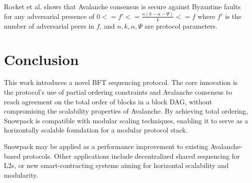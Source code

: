 \documentclass[12pt]{article}
\begin{document}
  Rocket et al. shows that Avalanche consensus is secure against Byzantine
  faults for any adversarial presence of $ 0 <= f' <=
  \frac{n(k-\alpha-\Psi)}{k} <= f $ where $f'$ is the number of adversarial
  peers in $f$, and $n, k, \alpha, \Psi$ are protocol parameters.

\section{Conclusion}
  This work introduces a novel BFT sequencing protocol. The core innovation is
  the protocol's use of partial ordering constraints and Avalanche consensus to
  reach agreement on the total order of blocks in a block DAG, without
  compromising the scalability properties of Avalanche. By achieving total
  ordering, Snowpack is compatible with modular scaling techniques, enabling it
  to serve as a horizontally scalable foundation for a modular protocol stack.

  Snowpack may be applied as a performance improvement to existing
  Avalanche-based protocols. Other applications include decentralized shared
  sequencing for L2s, or new smart-contracting systems aiming for horizontal
  scalability and modularity.



\end{document}
